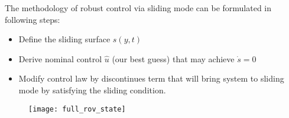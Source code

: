 The methodology of robust control via sliding mode can be formulated in following steps:
\begin{itemize}
    \item Define the sliding surface $s(y, t)$
    \item Derive nominal control $\hat{u}$ (our best guess) that may achieve $\dot{s} = 0$
    \item Modify control law by discontinues term that will bring system to sliding mode
    by satisfying the sliding condition.
\end{itemize}


\begin{figure}[H]
    \centering\texttt{[image: full\_rov\_state]}
\end{figure}


